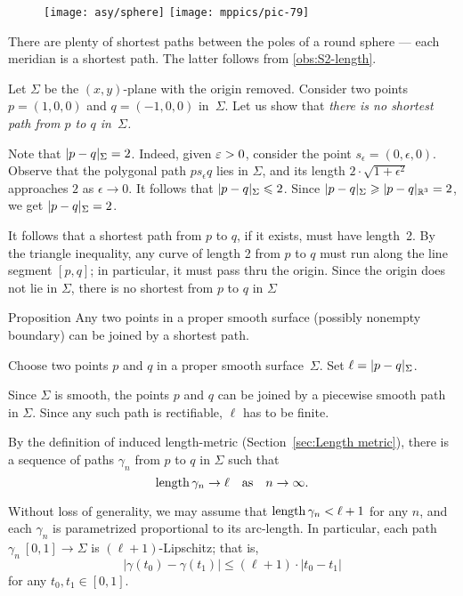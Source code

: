 {

\begin{wrapfigure}[9]{r}{28 mm}
\vskip-6mm
\centering
\texttt{[image: asy/sphere]}
\bigskip
\texttt{[image: mppics/pic-79]}
\end{wrapfigure}

 There are plenty of shortest paths between the poles of a round sphere --- each meridian is a shortest path.
The latter follows from \ref{obs:S2-length}.

 Let $\Sigma$ be the $(x,y)$-plane with the origin removed.
Consider two points $p=(1,0,0)$ and $q=(-1,0,0)$ in~$\Sigma$.
Let us show that \textit{there is no shortest path from $p$ to $q$ in~$\Sigma$.}

Note that $\dist{p}{q}\Sigma=2$. 
Indeed, given $\epsilon\z>0$, consider the point $s_\epsilon=(0,\epsilon,0)$.
Observe that the polygonal path $ps_\epsilon q$ lies in $\Sigma$, and its length $2\cdot\sqrt{1+\epsilon^2}$ approaches $2$ as $\epsilon\to0$.
It follows that $\dist{p}{q}\Sigma\le 2$.
Since $\dist{p}{q}\Sigma\z\ge \dist{p}{q}{\mathbb{R}^3}=2$, we get $\dist{p}{q}\Sigma=2$.

It follows that a shortest path from $p$ to $q$, if it exists, must have length~2.
By the triangle inequality, any curve of length 2 from $p$ to $q$ must run along the line segment $[p,q]$;
in particular, it must pass thru the origin.
Since the origin does not lie in $\Sigma$, there is no shortest from $p$ to $q$ in $\Sigma$ 


\begin{thm}{Proposition}\label{prop:shortest-paths-exist}
Any two points in a proper smooth surface (possibly nonempty boundary) can be joined by a shortest path. 
\end{thm}

Choose two points $p$ and $q$ in a proper smooth surface~$\Sigma$.
Set $\ell=\dist{p}{q}\Sigma$.

Since $\Sigma$ is smooth, the points $p$ and $q$ can be joined by a piecewise smooth path in $\Sigma$.
Since any such path is rectifiable, $\ell$ has to be finite.

By the definition of induced length-metric (Section~\ref{sec:Length metric}),
there is a sequence of paths $\gamma_n$ from $p$ to $q$ in $\Sigma$ such that
\[\mathop{\rm length}\nolimits\gamma_n\to \ell\quad\text{as}\quad n\to \infty.\]

Without loss of generality, we may assume that $\mathop{\rm length}\nolimits\gamma_n<\ell+1$ for any $n$, and each $\gamma_n$ is parametrized proportional to its arc-length.
In particular, each path $\gamma_n\:[0,1]\to\Sigma$ is $(\ell+1)$-Lipschitz; 
that is,
\[|\gamma(t_0)-\gamma(t_1)|\le (\ell+1)\cdot|t_0-t_1|\]
for any $t_0,t_1\in[0,1]$.

}
